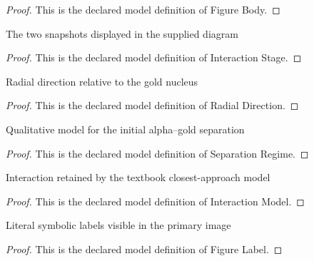 \begin{proof}
  This is the declared model definition of Figure Body.
\end{proof}
\begin{definition}
  \label{def:physics:phyx-mini-0635:phyxminiproblems-problemphyxmini0635-interactionstage}
  The two snapshots displayed in the supplied diagram
\end{definition}
\begin{proof}
  This is the declared model definition of Interaction Stage.
\end{proof}
\begin{definition}
  \label{def:physics:phyx-mini-0635:phyxminiproblems-problemphyxmini0635-radialdirection}
  Radial direction relative to the gold nucleus
\end{definition}
\begin{proof}
  This is the declared model definition of Radial Direction.
\end{proof}
\begin{definition}
  \label{def:physics:phyx-mini-0635:phyxminiproblems-problemphyxmini0635-separationregime}
  Qualitative model for the initial alpha--gold separation
\end{definition}
\begin{proof}
  This is the declared model definition of Separation Regime.
\end{proof}
\begin{definition}
  \label{def:physics:phyx-mini-0635:phyxminiproblems-problemphyxmini0635-interactionmodel}
  Interaction retained by the textbook closest-approach model
\end{definition}
\begin{proof}
  This is the declared model definition of Interaction Model.
\end{proof}
\begin{definition}
  \label{def:physics:phyx-mini-0635:phyxminiproblems-problemphyxmini0635-figurelabel}
  Literal symbolic labels visible in the primary image
\end{definition}
\begin{proof}
  This is the declared model definition of Figure Label.
\end{proof}
